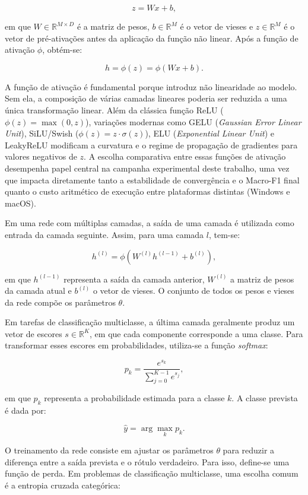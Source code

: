 \documentclass[
    12pt,
    openright,
    oneside,
    a4paper,
    english,
    brazil
]{abntex2}
\begin{document}
\[
z = Wx + b,
\]

em que \(W \in \mathbb{R}^{M \times D}\) é a matriz de pesos, \(b \in \mathbb{R}^{M}\) é o vetor de vieses e \(z \in \mathbb{R}^{M}\) é o vetor de pré-ativações antes da aplicação da função não linear. Após a função de ativação \(\phi\), obtém-se:

\[
h = \phi(z) = \phi(Wx + b).
\]

A função de ativação é fundamental porque introduz não linearidade ao modelo. Sem ela, a composição de várias camadas lineares poderia ser reduzida a uma única transformação linear. Além da clássica função ReLU (\(\phi(z) = \max(0, z)\)), variações modernas como GELU (\textit{Gaussian Error Linear Unit}), SiLU/Swish (\(\phi(z) = z \cdot \sigma(z)\)), ELU (\textit{Exponential Linear Unit}) e LeakyReLU modificam a curvatura e o regime de propagação de gradientes para valores negativos de \(z\). A escolha comparativa entre essas funções de ativação desempenha papel central na campanha experimental deste trabalho, uma vez que impacta diretamente tanto a estabilidade de convergência e o Macro-F1 final quanto o custo aritmético de execução entre plataformas distintas (Windows e macOS).

Em uma rede com múltiplas camadas, a saída de uma camada é utilizada como entrada da camada seguinte. Assim, para uma camada \(l\), tem-se:

\[
h^{(l)} = \phi\left(W^{(l)}h^{(l-1)} + b^{(l)}\right),
\]

em que \(h^{(l-1)}\) representa a saída da camada anterior, \(W^{(l)}\) a matriz de pesos da camada atual e \(b^{(l)}\) o vetor de vieses. O conjunto de todos os pesos e vieses da rede compõe os parâmetros \(\theta\).

Em tarefas de classificação multiclasse, a última camada geralmente produz um vetor de escores \(s \in \mathbb{R}^{K}\), em que cada componente corresponde a uma classe. Para transformar esses escores em probabilidades, utiliza-se a função \textit{softmax}:

\[
p_k =
\frac{e^{s_k}}
{\sum_{j=0}^{K-1} e^{s_j}},
\]

em que \(p_k\) representa a probabilidade estimada para a classe \(k\). A classe prevista é dada por:

\[
\hat{y} = \arg\max_k p_k.
\]

O treinamento da rede consiste em ajustar os parâmetros \(\theta\) para reduzir a diferença entre a saída prevista e o rótulo verdadeiro. Para isso, define-se uma função de perda. Em problemas de classificação multiclasse, uma escolha comum é a entropia cruzada categórica:
\end{document}
